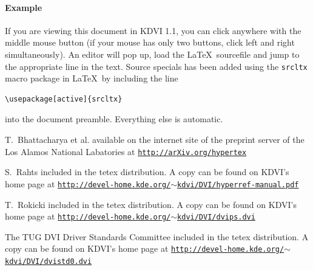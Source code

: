 \documentclass{article}
\newcommand{\KDVI}{{\sf KDVI 1.1}}
\begin{document}
\paragraph*{Example}
If you are viewing this document in \KDVI, you can click anywhere with
the middle mouse button (if your mouse has only two buttons, click
left and right simultaneously). An editor will pop up, load the
\LaTeX\ sourcefile and jump to the appropriate line in the
text. Source specials has been added using the {\tt srcltx} macro
package in \LaTeX\ by including the line
\begin{verbatim}
\usepackage[active]{srcltx}
\end{verbatim}
into the document preamble. Everything else is automatic.


\begin{thebibliography}{CM97}

T.~Bhattacharya et al.
\newblock available on the internet site of the preprint server of the
 Los Alamos National Labatories at 
\href{http://arXiv.org/hypertex}{\small \tt http://arXiv.org/hypertex}

S.~Rahts
\newblock included in the tetex distribution. A copy can be found on KDVI's 
home page at \hfill \linebreak
\href{http://devel-home.kde.org/~kdvi/DVI/hyperref-manual.pdf}{\small \tt http://devel-home.kde.org/$\sim$kdvi/DVI/hyperref-manual.pdf}

T.~Rokicki
\newblock included in the tetex distribution. A copy can be found on KDVI's 
home page at \hfill \linebreak
\href{http://devel-home.kde.org/~kdvi/DVI/dvips.dvi}{\small \tt http://devel-home.kde.org/$\sim$kdvi/DVI/dvips.dvi}

The TUG DVI Driver Standards Committee
\newblock included in the tetex distribution. A copy can be found on KDVI's 
home page at \hfill \linebreak
\href{http://devel-home.kde.org/~kdvi/DVI/dvistd0.dvi}{\small \tt http://devel-home.kde.org/$\sim$kdvi/DVI/dvistd0.dvi}


\end{thebibliography}
\end{document}
